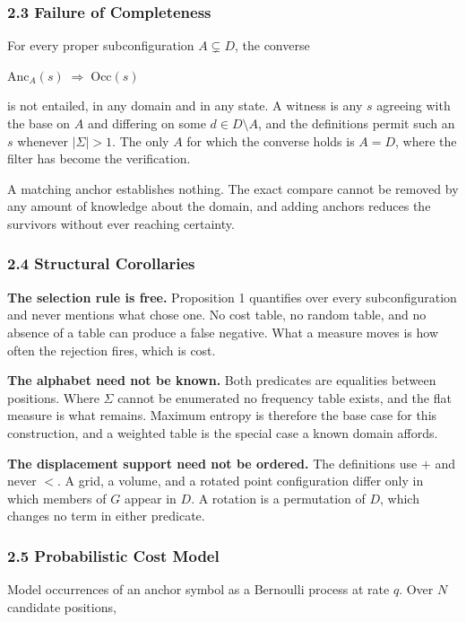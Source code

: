 \subsubsection{2.3 Failure of Completeness}

For every proper subconfiguration \(A \subsetneq D\), the converse

\(\mathrm{Anc}_A(s) \;\Longrightarrow\; \mathrm{Occ}(s)\)

is not entailed, in any domain and in any state. A witness is any \(s\) agreeing with the base on \(A\) and differing on some \(d \in D \setminus A\), and the definitions permit such an \(s\) whenever \(|\Sigma| > 1\). The only \(A\) for which the converse holds is \(A = D\), where the filter has become the verification.

A matching anchor establishes nothing. The exact compare cannot be removed by any amount of knowledge about the domain, and adding anchors reduces the survivors without ever reaching certainty.

\subsubsection{2.4 Structural Corollaries}

\textbf{The selection rule is free.} Proposition 1 quantifies over every subconfiguration and never mentions what chose one. No cost table, no random table, and no absence of a table can produce a false negative. What a measure moves is how often the rejection fires, which is cost.

\textbf{The alphabet need not be known.} Both predicates are equalities between positions. Where \(\Sigma\) cannot be enumerated no frequency table exists, and the flat measure is what remains. Maximum entropy is therefore the base case for this construction, and a weighted table is the special case a known domain affords.

\textbf{The displacement support need not be ordered.} The definitions use \(+\) and never \(<\). A grid, a volume, and a rotated point configuration differ only in which members of \(G\) appear in \(D\). A rotation is a permutation of \(D\), which changes no term in either predicate.

\subsubsection{2.5 Probabilistic Cost Model}

Model occurrences of an anchor symbol as a Bernoulli process at rate \(q\). Over \(N\) candidate positions,

